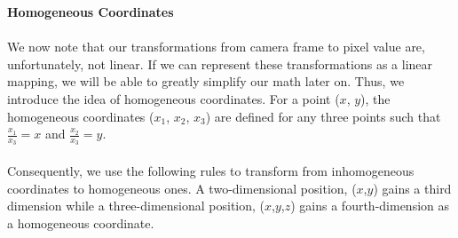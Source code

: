 \documentclass[]{article}
\begin{document}
	\textbf{Homogeneous Coordinates}\\\\
	We now note that our transformations from camera frame to pixel value are, unfortunately, not linear. If we can represent these transformations as a linear mapping, we will be able to greatly simplify our math later on. Thus, we introduce the idea of homogeneous coordinates. For a point ($x$, $y$), the homogeneous coordinates ($x_1$, $x_2$, $x_3$) are defined for any three points such that  $\frac{x_1}{x_3} = x$ and $\frac{x_2}{x_3} = y$. \\\\ Consequently, we use the following rules to transform from inhomogeneous coordinates to homogeneous ones. A two-dimensional position, ($x$,$y$) gains a third dimension while a three-dimensional position, ($x$,$y$,$z$) gains a fourth-dimension as a homogeneous coordinate.\\\\
	
\end{document}
